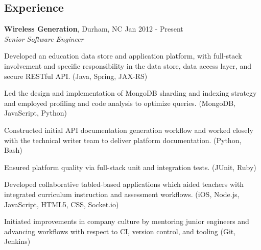 \documentclass[margin,line]{resume}
\begin{document}
\begin{resume}

  \section{\mysidestyle \textcolor{mySideColor}{Experience}}

  \textbf{Wireless Generation}, Durham, NC \hfill Jan 2012 - Present\vspace{1mm}\\
  \textsl{Senior Software Engineer}\\
  \vspace{-3mm}
  \begin{list2}
\item Developed an education data store and application platform, with full-stack
  involvement and specific responsibility in the data store, data access layer,
  and secure RESTful API. (Java, Spring, JAX-RS)
\item Led the design and implementation of MongoDB sharding and indexing strategy
  and employed profiling and code analysis to optimize queries. (MongoDB,
  JavaScript, Python)
\item Constructed initial API documentation generation workflow and worked closely
  with the technical writer team to deliver platform documentation. (Python,
  Bash)
\item Ensured platform quality via full-stack unit and integration tests. (JUnit,
  Ruby)
\item Developed collaborative tabled-based applications which aided teachers
  with integrated curriculum instruction and assessment workflows. (iOS,
  Node.js, JavaScript, HTML5, CSS, Socket.io)
\item Initiated improvements in company culture by mentoring junior engineers and
  advancing workflows with respect to CI, version control, and tooling (Git,
  Jenkins)
  \end{list2}


\end{resume}
\end{document}
